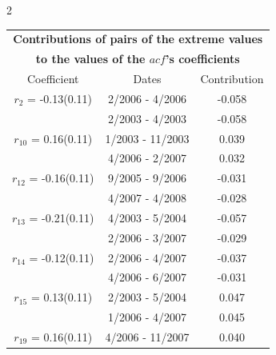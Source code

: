 
\thispagestyle{empty}
\begin{multicols}{2}{ 
\begin{tabular}{ccc}
\multicolumn{3}{c}{\textbf{Contributions of pairs of the extreme values} }  \vspace{-.10in}  \\ 
\multicolumn{3}{c}{ \textbf{to the values of the $acf$'s coefficients}} \\ 
\hline 
\hline                  Coefficient  &  Dates &  Contribution \\ 
\hline 
  $r_{ 2}$ = -0.13(0.11) &       2/2006 -  4/2006 &       -0.058    \vspace{-.10in} \\ 
  &        2/2003 -  4/2003 &       -0.058  \vspace{-.02in}   \\ \hline 
    $r_{10}$ = 0.16(0.11) &       1/2003 - 11/2003 &        0.039   \vspace{-.10in} \\  
&        4/2006 -  2/2007 &        0.032  \vspace{-.02in} \\ \hline 
  $r_{12}$ = -0.16(0.11) &       9/2005 -  9/2006 &       -0.031    \vspace{-.10in} \\ 
  &        4/2007 -  4/2008 &       -0.028  \vspace{-.02in}   \\ \hline 
    $r_{13}$ = -0.21(0.11) &       4/2003 -  5/2004 &       -0.057    \vspace{-.10in} \\ 
  &        2/2006 -  3/2007 &       -0.029  \vspace{-.02in}   \\ \hline 
    $r_{14}$ = -0.12(0.11) &       2/2006 -  4/2007 &       -0.037    \vspace{-.10in} \\ 
  &        4/2006 -  6/2007 &       -0.031  \vspace{-.02in}   \\ \hline 
    $r_{15}$ = 0.13(0.11) &       2/2003 -  5/2004 &        0.047   \vspace{-.10in} \\  
&        1/2006 -  4/2007 &        0.045  \vspace{-.02in} \\ \hline 
  $r_{19}$ = 0.16(0.11) &       4/2006 - 11/2007 &        0.040   \vspace{-.10in} \\  

\end{tabular}}
\end{multicols}
